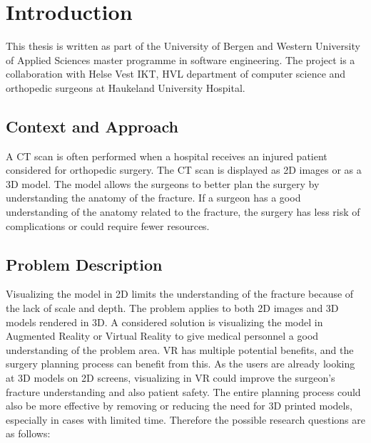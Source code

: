 \documentclass[a4paper]{report}
\begin{document}

\pagebreak
\tableofcontents
\listoffigures


\chapter{Introduction}
This thesis is written as part of the University of Bergen and Western University of Applied Sciences master programme in software engineering. The project is a collaboration with Helse Vest IKT, HVL department of computer science and orthopedic surgeons at Haukeland University Hospital.

\section{Context and Approach}
A CT scan is often performed when a hospital receives an injured patient considered for orthopedic surgery. The CT scan is displayed as 2D images or as a 3D model. The model allows the surgeons to better plan the surgery by understanding the anatomy of the fracture.
If a surgeon has a good understanding of the anatomy related to the fracture,
the surgery has less risk of complications or could require fewer resources.

\section{Problem Description}
Visualizing the model in 2D limits the understanding of the fracture because of the lack of scale and depth. The problem applies to both 2D images and 3D models rendered in 3D.
A considered solution is visualizing the model in Augmented Reality or Virtual Reality to give medical personnel a good understanding of the problem area.
VR has multiple potential benefits, and the surgery planning process can benefit from this. As the users are already looking at 3D models on 2D screens, visualizing in VR could improve the surgeon's fracture understanding and also patient safety. The entire planning process could also be more effective by removing or reducing the need for 3D printed models, especially in cases with limited time.
Therefore the possible research questions are as follows:
\end{document}
